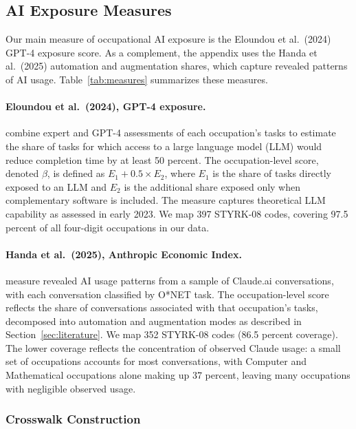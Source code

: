 \documentclass[12pt]{article}
\begin{document}
\subsection{AI Exposure Measures}\label{sec:data:ai}

Our main measure of occupational AI exposure is the Eloundou et al.\ (2024) GPT-4 exposure score. As a complement, the appendix uses the Handa et al.\ (2025) automation and augmentation shares, which capture revealed patterns of AI usage. Table~\ref{tab:measures} summarizes these measures.

\paragraph{Eloundou et al.\ (2024), GPT-4 exposure.} \citet{eloundou2024} combine expert and GPT-4 assessments of each occupation's tasks to estimate the share of tasks for which access to a large language model (LLM) would reduce completion time by at least 50 percent. The occupation-level score, denoted $\beta$, is defined as $E_1 + 0.5 \times E_2$, where $E_1$ is the share of tasks directly exposed to an LLM and $E_2$ is the additional share exposed only when complementary software is included. The measure captures theoretical LLM capability as assessed in early 2023. We map 397 STYRK-08 codes, covering 97.5 percent of all four-digit occupations in our data.

\paragraph{Handa et al.\ (2025), Anthropic Economic Index.} \citet{handa2025} measure revealed AI usage patterns from a sample of Claude.ai conversations, with each conversation classified by O*NET task. The occupation-level score reflects the share of conversations associated with that occupation's tasks, decomposed into automation and augmentation modes as described in Section~\ref{sec:literature}. We map 352 STYRK-08 codes (86.5 percent coverage). The lower coverage reflects the concentration of observed Claude usage: a small set of occupations accounts for most conversations, with Computer and Mathematical occupations alone making up 37 percent, leaving many occupations with negligible observed usage.

\subsubsection*{Crosswalk Construction}
\end{document}
